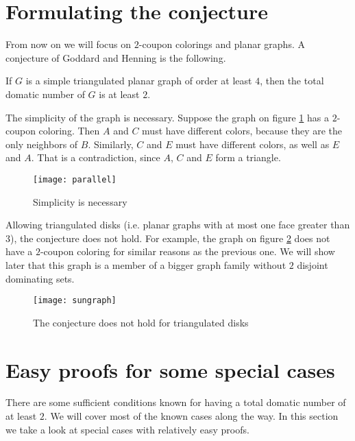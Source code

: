 \section{Formulating the conjecture}

From now on we will focus on $2$-coupon colorings and planar graphs.
A conjecture of Goddard and Henning \cite{gh} is the following.

\begin{conj} \label{conj}
  If $G$ is a simple triangulated planar graph of order at least $4$, then the
  total domatic number of $G$ is at least $2$.
\end{conj}

\begin{remark}
  The simplicity of the graph is necessary. Suppose the graph on figure
  \ref{fig:parallel} has a $2$-coupon coloring. Then $A$ and $C$ must have
  different colors, because they are the only neighbors of $B$. Similarly, $C$
  and $E$ must have different colors, as well as $E$ and $A$. That is a
  contradiction, since $A$, $C$ and $E$ form a triangle.
\end{remark}

\begin{figure}[ht]
  \centering
  \texttt{[image: parallel]}
  \caption{Simplicity is necessary}
  \label{fig:parallel}
\end{figure}

\begin{remark}
  Allowing triangulated disks (i.e. planar graphs with at most one face greater
  than $3$), the conjecture does not hold. For example, the graph on figure
  \ref{fig:sungraph} does not have a $2$-coupon coloring for similar reasons as
  the previous one. We will show later that this graph is a member of a bigger
  graph family without $2$ disjoint dominating sets.
\end{remark}

\begin{figure}[ht]
  \centering
  \texttt{[image: sungraph]}
  \caption{The conjecture does not hold for triangulated disks}
  \label{fig:sungraph}
\end{figure}

\section{Easy proofs for some special cases}

There are some sufficient conditions known for having a total domatic number of
at least $2$. We will cover most of the known cases along the way. In this section
we take a look at special cases with relatively easy proofs.

